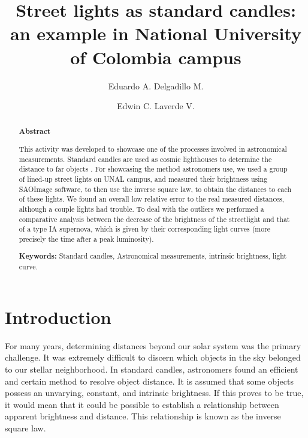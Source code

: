 \documentclass[aps,rmp,twocolumn,nofootinbib,superscriptaddress,floatfix,longbibliography]{revtex4-2}
\begin{document}
\title{\large Street lights as standard candles: an example in National University of Colombia campus }

\begin{abstract}
\normalsize
\begin{center}\textbf{Abstract}\\
\end{center}
This activity was developed to showcase one of the processes involved in astronomical measurements. Standard candles are used as cosmic lighthouses to determine the distance to far objects \cite{paper_possel}. For showcasing the method astronomers use, we used a group of lined-up street lights on UNAL campus, and measured their brightness using SAOImage software, to then use the inverse square law, to obtain the distances to each of these lights. We found an overall low relative error to the real measured distances, although a couple lights had trouble. To deal with the outliers we performed a comparative analysis between the decrease of the brightness of the streetlight and that of a type IA supernova, which is given by their corresponding light curves (more precisely the time after a peak luminosity).
 
\textbf{Keywords:} Standard candles, Astronomical measurements, intrinsic brightness, light curve.
\end{abstract}


\author{Eduardo A. Delgadillo M. }

\author{Edwin C. Laverde V.}


\rhead[]{\today}

\maketitle
\thispagestyle{fancy}


\section{Introduction}
For many years, determining distances beyond our solar system was the primary challenge. It was extremely difficult to discern which objects in the sky belonged to our stellar neighborhood. 
In standard candles, astronomers found an efficient and certain method to resolve object distance. It is assumed that some objects possess an unvarying, constant, and intrinsic brightness. If this proves to be true, it would mean that it could be possible to establish a relationship between apparent brightness and distance. This relationship is known as the inverse square law.
\end{document}

